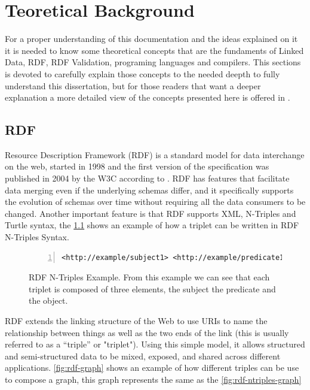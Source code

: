 \chapter{Teoretical Background}
\label{ch:theo-back}

For a proper understanding of this documentation and the ideas explained on it it is
needed to know some theoretical concepts that are the fundaments of Linked Data, RDF,
RDF Validation, programing languages and compilers. This sections is devoted to carefully
explain those concepts to the needed deepth to fully understand this dissertation, but for
those readers that want a deeper explanation a more detailed view of the concepts
presented here is offered in \cite{labra-validating-rdf, eric-rdf-validation-lang,
programing-language}.


\section{RDF}
\label{sec:theo-back-rdf}
Resource Description Framework (RDF) is a standard model for data interchange on the web,
started in 1998 and the first version of the specification was published in 2004 by the W3C
according to \cite{rdf-primer}. RDF has features that facilitate data merging even if the
underlying schemas differ, and it specifically supports the evolution of schemas over time
without requiring all the data consumers to be changed. Another important feature is that RDF
supports XML, N-Triples and Turtle syntax, the \cref{fig:rdf-ntriples-ex} shows an example of
how a triplet can be written in RDF N-Triples Syntax.

\begin{figure}
\begin{lstlisting}[numbers=left, basicstyle=\ttfamily\scriptsize]
<http://example/subject1> <http://example/predicate1> <http://example/object1> .
\end{lstlisting}
\caption[RDF N-Triples Example]{RDF N-Triples Example. From this example we can see that each triplet is
composed of three elements, the subject the predicate and the object.}
\label{fig:rdf-ntriples-ex}
\end{figure}

RDF extends the linking structure of the Web to use URIs to name the relationship between
things as well as the two ends of the link (this is usually referred to as a “triple” or "triplet").
Using this simple model, it allows structured and semi-structured data to be mixed, exposed,
and shared across different applications. \ref{fig:rdf-graph} shows an example of how different
triples can be use to compose a graph, this graph represents the same as the \cref{fig:rdf-ntriples-graph}

